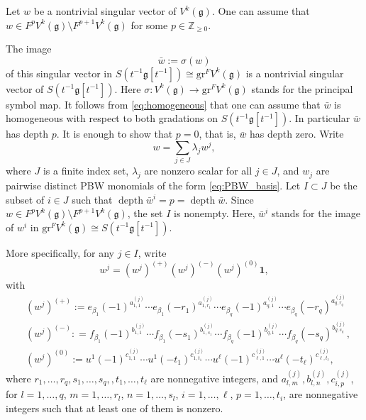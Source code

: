 \documentclass[11pt]{article}
\numberwithin{equation}{section}
\let\be\beta
\newcommand\Z{{\mathbb Z}}
\DeclareMathOperator{\dep}{depth}
\newcommand \g{\mathfrak g}
\theoremstyle{definition}
\begin{document}
Let $w$ be a nontrivial singular vector of $V^k(\g)$.
One can assume that $w \in F^p V^k(\g) \setminus F^{p+1} V^k(\g)$ for
some $p\in \Z_{\geq 0}$.

The image
\[
\bar{w}:=\sigma(w)
\]
of this singular vector in $S(t^{-1}\g[t^{-1}]) \cong \mathrm{gr}^F V^k(\g)$
is a nontrivial singular vector of $S(t^{-1}\g[t^{-1}])$.
Here $\sigma \colon V^k(\g) \to \mathrm{gr}^F V^k(\g)$
stands for the principal symbol map.
It follows from \eqref{eq:homogeneous}
that one can assume that $\bar{w}$ is homogeneous with respect to both gradations
on $S(t^{-1}\g[t^{-1}])$.
In particular $\bar w$ has depth $p$. It is enough to show that
$p=0$, that is, $\bar w$ has depth zero.
Write
\[
w = \sum_{j \in J} \lambda_j w^j,
\]
where $J$ is a finite index set, $\lambda_j $ are nonzero
scalar for all $j \in J$,
and $w_j$ are pairwise distinct PBW monomials of the form \eqref{eq:PBW_basis}.
Let $I \subset J$ be the subset of $i \in J$ such that $\dep \bar w^{i} = p = \dep \bar w$.
Since $w \in F^p V^k(\g) \setminus F^{p+1} V^k(\g)$,
the set $I$ is nonempty.
Here, $\bar{w}^{i}$ stands for the image of $w^{i}$ in $\mathrm{gr}^F V^k(\g) \cong S(t^{-1}\g[t^{-1}])$.

More specifically, for any $j \in I$, write
\begin{equation}
\label{eq:PBW_w_i}
w^{j} = (w^{j})^{(+)} (w^{j})^{(-)} (w^{j})^{(0)} \mathbf{1},
\end{equation}
with
\begin{align*}
& (w^{j})^{(+)} := e_{\be_{1}}(-1)^{a_{1,1}^{(j)}}\cdots
e_{\be_{1}} (- r_1)^{a_{1,r_1}^{(j)}}\cdots
e_{\be_q}(- 1)^{a_{q,1}^{(j)}}\cdots e_{\be_q}(- r_q)^{a_{q,r_q}^{(j)}} \\\nonumber
& (w^{j})^{(-)} : =f_{\be_1}(-1)^{b_{1,1}^{(j)}}\cdots f_{\be_1}(- s_1)^{b_{1,s_1}^{(j)}}\cdots
f_{\be_q}(- 1)^{b_{q,1}^{(j)}}
\cdots f_{\be_q}(- s_q)^{b_{q,s_q}^{(j)}}, \\\nonumber
& (w^{j})^{(0)} := u^1(- 1)^{c_{1,1}^{(j)}}\cdots u^1(- t_1)^{c_{1,t_1}^{(j)}}
\cdots u^\ell (- 1)^{c_{\ell,1}^{(j)}}\cdots u^\ell(- t_\ell)^{c_{\ell, t_\ell}^{(j)}},
\end{align*}
where $r_1,\dots,r_q, s_1,\dots,s_q,,t_1,\dots,t_\ell$
are nonnegative integers, and
$a_{l,m}^{(j)},b_{l,n}^{(j)},c_{i,p}^{(j)}$, for $l =1,\dots,q$,
$m=1,\dots,r_l$, $n=1,\dots,s_l$,
$i =1,\dots,\ell$,
$p=1,\dots,t_i$,
are nonnegative integers such
that at least one of them is nonzero.
\end{document}
